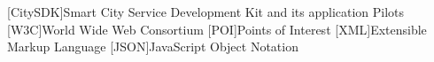 [CitySDK]{Smart City Service Development Kit and its application Pilots}
[W3C]{World Wide Web Consortium}
[POI]{Points of Interest}
[XML]{Extensible Markup Language}
[JSON]{JavaScript Object Notation}